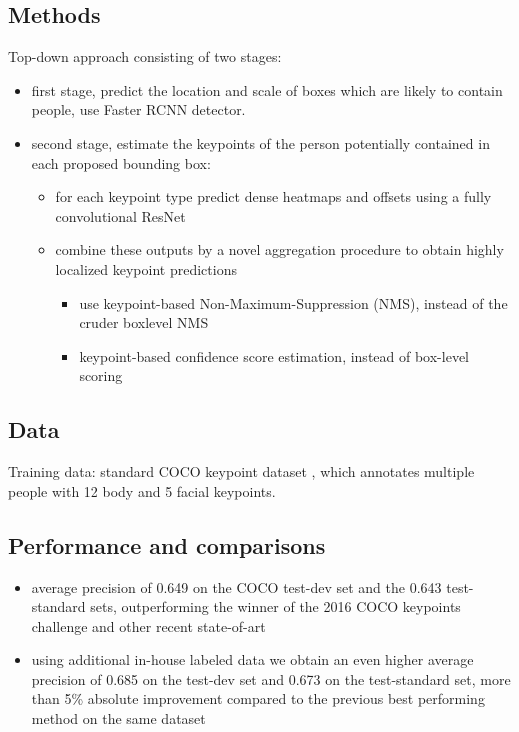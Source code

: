 \subsection{Methods}
 Top-down approach consisting of two stages:
 \begin{itemize}
    \item first stage, predict the location and scale of boxes which are likely to contain people, use Faster RCNN detector.
    \item second stage, estimate the keypoints of the person potentially contained in each proposed bounding box:
        \begin{itemize}
            \item for each keypoint type predict dense heatmaps and offsets using a fully convolutional ResNet
            \item combine these outputs by a novel aggregation procedure to obtain highly localized keypoint predictions

             \begin{itemize}
             \item use keypoint-based Non-Maximum-Suppression (NMS), instead of the cruder boxlevel NMS
             \item keypoint-based confidence score estimation, instead of box-level scoring
    
             \end{itemize}
        \end{itemize}
 \end{itemize}


\subsection{Data}

Training data: standard COCO keypoint dataset \cite{coco2016}, which annotates multiple people with 12 body and 5 facial keypoints.


\subsection{Performance and comparisons}
\begin{itemize}
    \item average precision of 0.649 on the COCO test-dev set and the 0.643 test-standard sets, outperforming the winner of the 2016 COCO keypoints challenge and other recent state-of-art
    \item using additional in-house labeled data we obtain an even higher average precision of 0.685 on the test-dev set and 0.673 on the test-standard set, more than 5\% absolute improvement compared to the previous best performing method on the same dataset

\end{itemize}



